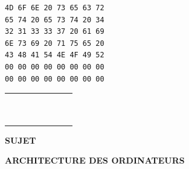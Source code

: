 \documentclass[11pt,a4paper]{article}
\newcommand{\TitreMatiere}{Architecture des Ordinateurs}
\begin{document}
\begin{table}[ht!]
  \centering
  \begin{minipage}{0.4\textwidth}
    \centering
\begin{lstlisting}[style=algorithmique]
4D 6F 6E 20 73 65 63 72
65 74 20 65 73 74 20 34
32 31 33 33 37 20 61 69
6E 73 69 20 71 75 65 20
43 48 41 54 4E 4F 49 52
00 00 00 00 00 00 00 00
00 00 00 00 00 00 00 00
\end{lstlisting}
  \end{minipage}
  \hfillx
  \begin{minipage}{0.45\textwidth}
    \centering

%
%
%
%
%
%
%

\begin{tabular}{ | m{0.45cm} | m{0.45cm} | m{0.45cm} | m{0.45cm}   |   m{0.45cm} | m{0.45cm} | m{0.45cm} | m{0.45cm} | }
\hline
 & & &   &   & & & \\
 & & &   &   & & & \\
\hline
 & & &   &   & & & \\
 & & &   &   & & & \\
\hline
 & & &   &   & & & \\
 & & &   &   & & & \\
\hline
 & & &   &   & & & \\
 & & &   &   & & & \\
\hline
 & & &   &   & & & \\
 & & &   &   & & & \\
\hline
\end{tabular}

  \end{minipage}
\end{table}



%
%

\newpage



\vfillFirst

\begin{center}

\begin{LARGE}
\textbf{SUJET}

\bigskip

\textbf{\MakeUppercase{\TitreMatiere}}
\end{LARGE}

\end{center}

\vfillLast
\end{document}
